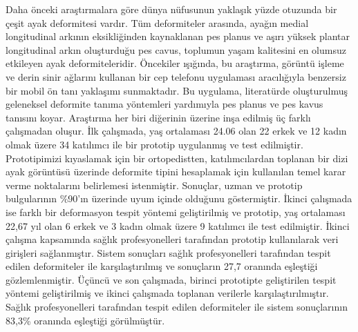 \begin{ozet}
Daha önceki araştırmalara göre dünya nüfusunun yaklaşık yüzde otuzunda bir çeşit ayak deformitesi vardır. Tüm deformiteler arasında, ayağın medial longitudinal arkının eksikliğinden kaynaklanan pes planus ve aşırı yüksek plantar longitudinal arkın oluşturduğu pes cavus, toplumun yaşam kalitesini en olumsuz etkileyen ayak deformiteleridir. Öncekiler ışığında, bu araştırma, görüntü işleme ve derin sinir ağlarını kullanan bir cep telefonu uygulaması aracılığıyla benzersiz bir mobil ön tanı yaklaşımı sunmaktadır. Bu uygulama, literatürde oluşturulmuş geleneksel deformite tanıma yöntemleri yardımıyla pes planus ve pes kavus tanısını koyar. Araştırma her biri diğerinin üzerine inşa edilmiş üç farklı çalışmadan oluşur. İlk çalışmada, yaş ortalaması 24.06 olan 22 erkek ve 12 kadın olmak üzere 34 katılımcı ile bir prototip uygulanmış ve test edilmiştir. Prototipimizi kıyaslamak için bir ortopedistten, katılımcılardan toplanan bir dizi ayak görüntüsü üzerinde deformite tipini hesaplamak için kullanılan temel karar verme noktalarını belirlemesi istenmiştir. Sonuçlar, uzman ve prototip bulgularının \%90'ın üzerinde uyum içinde olduğunu göstermiştir. İkinci çalışmada ise farklı bir deformasyon tespit yöntemi geliştirilmiş ve prototip, yaş ortalaması 22,67 yıl olan 6 erkek ve 3 kadın olmak üzere 9 katılımcı ile test edilmiştir. İkinci çalışma kapsamında sağlık profesyonelleri tarafından prototip kullanılarak veri girişleri sağlanmıştır. Sistem sonuçları sağlık profesyonelleri tarafından tespit edilen deformiteler ile karşılaştırılmış ve sonuçların 27,7 oranında eşleştiği gözlemlenmiştir. Üçüncü ve son çalışmada, birinci prototipte geliştirilen tespit yöntemi geliştirilmiş ve ikinci çalışmada toplanan verilerle karşılaştırılmıştır. Sağlık profesyonelleri tarafından tespit edilen deformiteler ile sistem sonuçlarının 83,3\% oranında eşleştiği görülmüştür.
\end{ozet}
